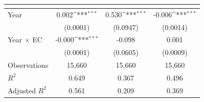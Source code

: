 {
\def\sym#1{\ifmmode^{#1}\else\(^{#1}\)\fi}
\begin{tabular}{l*{3}{c}}
\toprule
            &&&\\
\midrule
Year        &       0.002\sym{***}&       0.530\sym{***}&      -0.006\sym{***}\\
            &    (0.0001)         &    (0.0947)         &    (0.0014)         \\
Year $\times$ EC&      -0.000\sym{***}&      -0.098         &       0.001         \\
            &    (0.0001)         &    (0.0605)         &    (0.0009)         \\
\midrule
Observations&      15,660         &      15,660         &      15,660         \\
$R^{2}$     &       0.649         &       0.367         &       0.496         \\
Adjusted $R^{2}$&       0.561         &       0.209         &       0.369         \\
\bottomrule
\end{tabular}
}
